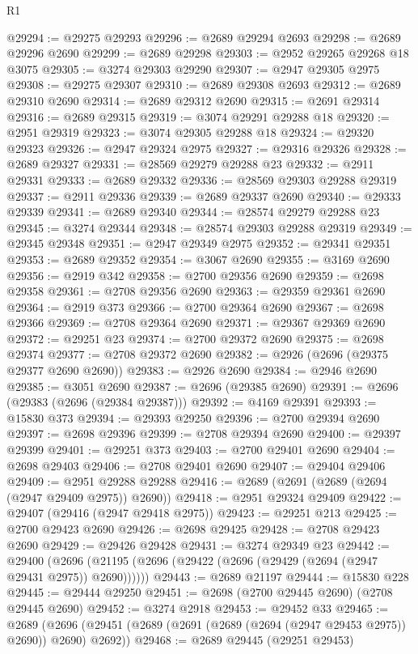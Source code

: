 \begin{lexlean}{R1}
\begin{coremodule}
@29294 := @29275 @29293
@29296 := @2689 @29294 @2693
@29298 := @2689 @29296 @2690
@29299 := @2689 @29298
@29303 := @2952 @29265 @29268 @18 @3075
@29305 := @3274 @29303 @29290
@29307 := @2947 @29305 @2975
@29308 := @29275 @29307
@29310 := @2689 @29308 @2693
@29312 := @2689 @29310 @2690
@29314 := @2689 @29312 @2690
@29315 := @2691 @29314
@29316 := @2689 @29315
@29319 := @3074 @29291 @29288 @18
@29320 := @2951 @29319
@29323 := @3074 @29305 @29288 @18
@29324 := @29320 @29323
@29326 := @2947 @29324 @2975
@29327 := @29316 @29326
@29328 := @2689 @29327
@29331 := @28569 @29279 @29288 @23
@29332 := @2911 @29331
@29333 := @2689 @29332
@29336 := @28569 @29303 @29288 @29319
@29337 := @2911 @29336
@29339 := @2689 @29337 @2690
@29340 := @29333 @29339
@29341 := @2689 @29340
@29344 := @28574 @29279 @29288 @23
@29345 := @3274 @29344
@29348 := @28574 @29303 @29288 @29319
@29349 := @29345 @29348
@29351 := @2947 @29349 @2975
@29352 := @29341 @29351
@29353 := @2689 @29352
@29354 := @3067 @2690
@29355 := @3169 @2690
@29356 := @2919 @342
@29358 := @2700 @29356 @2690
@29359 := @2698 @29358
@29361 := @2708 @29356 @2690
@29363 := @29359 @29361 @2690
@29364 := @2919 @373
@29366 := @2700 @29364 @2690
@29367 := @2698 @29366
@29369 := @2708 @29364 @2690
@29371 := @29367 @29369 @2690
@29372 := @29251 @23
@29374 := @2700 @29372 @2690
@29375 := @2698 @29374
@29377 := @2708 @29372 @2690
@29382 := @2926 (@2696 (@29375 @29377 @2690 @2690))
@29383 := @2926 @2690
@29384 := @2946 @2690
@29385 := @3051 @2690
@29387 := @2696 (@29385 @2690)
@29391 := @2696 (@29383 (@2696 (@29384 @29387)))
@29392 := @4169 @29391
@29393 := @15830 @373
@29394 := @29393 @29250
@29396 := @2700 @29394 @2690
@29397 := @2698 @29396
@29399 := @2708 @29394 @2690
@29400 := @29397 @29399
@29401 := @29251 @373
@29403 := @2700 @29401 @2690
@29404 := @2698 @29403
@29406 := @2708 @29401 @2690
@29407 := @29404 @29406
@29409 := @2951 @29288 @29288
@29416 := @2689 (@2691 (@2689 (@2694 (@2947 @29409 @2975)) @2690))
@29418 := @2951 @29324 @29409
@29422 := @29407 (@29416 (@2947 @29418 @2975))
@29423 := @29251 @213
@29425 := @2700 @29423 @2690
@29426 := @2698 @29425
@29428 := @2708 @29423 @2690
@29429 := @29426 @29428
@29431 := @3274 @29349 @23
@29442 := @29400
    (@2696 (@21195 (@2696 (@29422 (@2696 (@29429 (@2694 (@2947 @29431 @2975)) @2690))))))
@29443 := @2689 @21197
@29444 := @15830 @228
@29445 := @29444 @29250
@29451 := @2698 (@2700 @29445 @2690) (@2708 @29445 @2690)
@29452 := @3274 @2918
@29453 := @29452 @33
@29465 := @2689
    (@2696 (@29451 (@2689 (@2691 (@2689 (@2694 (@2947 @29453 @2975)) @2690)) @2690) @2692))
@29468 := @2689 @29445 (@29251 @29453)

\end{coremodule}
\end{lexlean}
